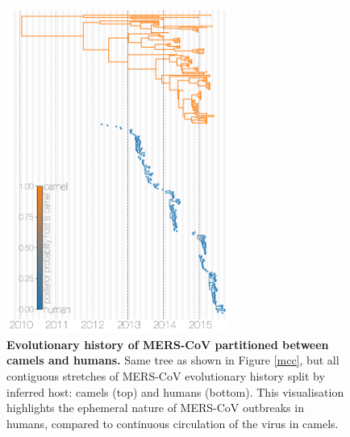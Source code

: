 \documentclass[11pt,oneside,letterpaper]{article}
\begin{document}
\begin{figure}[h]
\centering
	\includegraphics[width=0.65\textwidth]{figures/mers_exploded.png}
	\caption{\textbf{Evolutionary history of MERS-CoV partitioned between camels and humans.}
Same tree as shown in Figure \ref{mcc}, but all contiguous stretches of MERS-CoV evolutionary history split by inferred host: camels (top) and humans (bottom).
This visualisation highlights the ephemeral nature of MERS-CoV outbreaks in humans, compared to continuous circulation of the virus in camels.
	}
	\label{exploded}
\end{figure}
\end{document}
